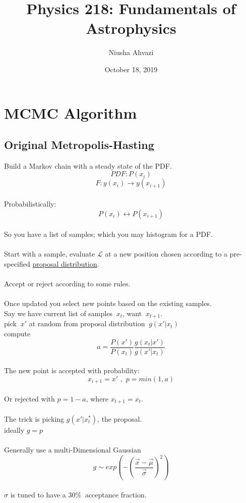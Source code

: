 \documentclass{article}
\title{Physics 218: Fundamentals of Astrophysics}
\author{Niusha Ahvazi }
\date{October 18, 2019}
\begin{document}
\maketitle

\section{MCMC Algorithm}
\subsection{Original Metropolis-Hasting}
Build a Markov chain with a steady state of the PDF.\\
\[PDF: P(x_i)\]
\[F: y(x_i)\rightarrow y(x_{i+1})\]\\
Probabilistically: \[P(x_i)	\leftrightarrow P(x_{i+1})\]\\
So you have a list of samples; which you may histogram for a PDF.\\
\\
Start with a sample, evaluate $\mathcal{L}$ at a new position chosen according to a pre-specified \underline{proposal distribution}.\\
\\
Accept or reject according to some rules.\\
\\
Once updated you select new points based on the existing samples.\\
Say we have current list of samples \( \ x_t \), want \( \ x_{t+1} \).\\
pick  \( \ x' \) at random from proposal distribution  \( \ g(x'|x_t) \)\\
compute\\
\[a=\frac{P(x')}{P(x_t)}\frac{g(x_t|x')}{g(x'|x_t)}\]\\
The new point is accepted with probability:\[x_{i+1}=x'\,\, ,\,\,p=min(1,a)  \]\\
Or rejected with \( p=1-a \), where \( x_{t+1}=x_t\).\\
\\
The trick is picking \( g(x'|x_t^*) \), the proposal.\\ ideally \(g=p\)\\
\\
Generally use a multi-Dimensional Gaussian\\
\[ g \sim exp(-(\frac{\vec{x}-\vec{\mu}}{\vec{\sigma}})^2)\]\\
\(\sigma\) is tuned to have a \(30\%\ \) acceptance fraction.\\
\end{document}

